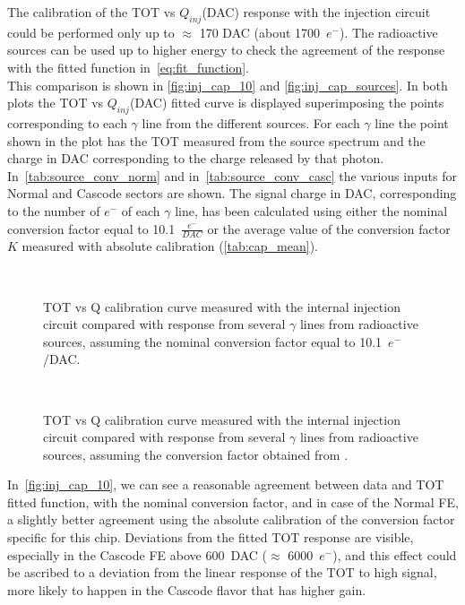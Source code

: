 The calibration of the TOT vs $Q_{inj}$(DAC) response with the injection circuit could be performed only up to $\approx$ 170 DAC (about 1700~$e^{-}$). The radioactive sources can be used up to higher energy to check the agreement of the response with the fitted function in~\autoref{eq:fit_function}.\\

This comparison is shown in \autoref{fig:inj_cap_10} and \autoref{fig:inj_cap_sources}. In both plots the TOT vs $Q_{inj}$(DAC) fitted curve is displayed superimposing the points corresponding to each $\gamma$ line from the different sources. 
For each $\gamma$ line the point shown in the plot has the TOT measured from the source spectrum and the charge in DAC corresponding to the charge released by that photon.  
In~\autoref{tab:source_conv_norm} and in~\autoref{tab:source_conv_casc} the various inputs for Normal and Cascode sectors are shown. 
The signal charge in DAC, corresponding to the number of $e^{-}$ of each $\gamma$ line, has been calculated using either the nominal conversion factor equal to 10.1~$\frac{e^{-}}{DAC}$ or the average value of the conversion factor $K$ measured with  absolute calibration (\autoref{tab:cap_mean}). 

\begin{figure}
\centering
{}\quad
{}\\
\caption{TOT vs Q calibration curve measured with the internal injection circuit compared with response from several $\gamma$ lines from radioactive sources, assuming the nominal conversion factor equal to 10.1~$e^{-}$/DAC.}
\label{fig:inj_cap_10}
\end{figure} 


\begin{figure}[h!]
\centering
{}\quad
{}\\
\caption{TOT vs Q calibration curve measured with the internal injection circuit compared with response from several $\gamma$ lines from radioactive sources, assuming the conversion factor obtained from .}
\label{fig:inj_cap_sources}
\end{figure} 

In~\autoref{fig:inj_cap_10}, we can see a reasonable agreement between data and TOT fitted function, with the nominal conversion factor, and in case of the Normal FE, a slightly better agreement using the absolute calibration of the conversion factor specific for this chip. 
Deviations from the fitted TOT response are visible, especially in the Cascode FE above \SI{600}{DAC} ($\approx$ 6000~$e^{-}$), and this effect could be ascribed to a deviation from the linear response of the TOT to high signal, more likely to happen in the Cascode flavor that has higher gain.

